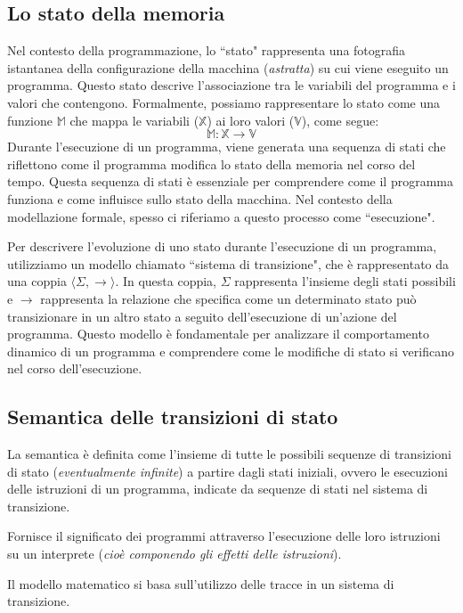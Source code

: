 \subsection{Lo stato della memoria}
Nel contesto della programmazione, lo ``stato" rappresenta una
fotografia istantanea della configurazione della macchina (\textit{astratta})
su cui viene eseguito un programma. Questo stato descrive l'associazione
tra le variabili del programma e i valori che contengono. Formalmente,
possiamo rappresentare lo stato come una funzione $\mathbb{M}$ che
mappa le variabili ($\mathbb{X}$) ai loro valori ($\mathbb{V}$), come
segue:
\[
  \mathbb{M} : \mathbb{X} \rightarrow \mathbb{V}
\]
Durante l'esecuzione di un programma, viene generata una sequenza di
stati che riflettono come il programma modifica lo stato della memoria
nel corso del tempo. Questa sequenza di stati è essenziale per
comprendere come il programma funziona e come influisce sullo stato
della macchina. Nel contesto della modellazione formale, spesso ci
riferiamo a questo processo come ``esecuzione".

Per descrivere l'evoluzione di uno stato durante l'esecuzione di
un programma, utilizziamo un modello chiamato ``sistema di transizione",
che è rappresentato da una coppia $\langle \Sigma, \rightarrow \rangle$.
In questa coppia, $\Sigma$ rappresenta l'insieme degli stati possibili
e $\rightarrow$ rappresenta la relazione che specifica come un
determinato stato può transizionare in un altro stato a seguito
dell'esecuzione di un'azione del programma. Questo modello è
fondamentale per analizzare il comportamento dinamico di un programma
e comprendere come le modifiche di stato si verificano nel corso
dell'esecuzione.
\subsection{Semantica delle transizioni di stato}

La semantica è definita come l'insieme di tutte le possibili sequenze
di transizioni di stato (\textit{eventualmente infinite}) a partire dagli stati
iniziali, ovvero le esecuzioni delle istruzioni di un programma,
indicate da sequenze di stati nel sistema di transizione.

Fornisce il significato dei programmi attraverso l'esecuzione delle
loro istruzioni su un interprete (\textit{cioè componendo gli effetti delle
istruzioni}).

Il modello matematico si basa sull'utilizzo delle tracce in un sistema
di transizione.

